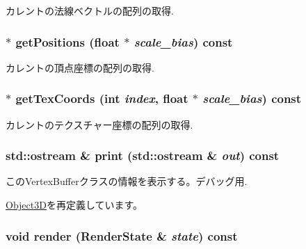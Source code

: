 カレントの法線ベクトルの配列の取得. \hypertarget{classm3g_1_1VertexBuffer_5ca059361f9f834dd00b5d595bf3df0b}{
\subsubsection[{getPositions}]{ $\ast$ getPositions (float $\ast$ {\em scale\_\-bias}) const}}
\label{classm3g_1_1VertexBuffer_5ca059361f9f834dd00b5d595bf3df0b}


カレントの頂点座標の配列の取得. \hypertarget{classm3g_1_1VertexBuffer_9015840c09da0691c31a8aab5e09404a}{
\subsubsection[{getTexCoords}]{ $\ast$ getTexCoords (int {\em index}, \/  float $\ast$ {\em scale\_\-bias}) const}}
\label{classm3g_1_1VertexBuffer_9015840c09da0691c31a8aab5e09404a}


カレントのテクスチャー座標の配列の取得. \hypertarget{classm3g_1_1VertexBuffer_6fea17fa1532df3794f8cb39cb4f911f}{
\subsubsection[{print}]{\setlength{\rightskip}{0pt plus 5cm}std::ostream \& print (std::ostream \& {\em out}) const}}
\label{classm3g_1_1VertexBuffer_6fea17fa1532df3794f8cb39cb4f911f}


このVertexBufferクラスの情報を表示する。デバッグ用. 

\hyperlink{classm3g_1_1Object3D_6fea17fa1532df3794f8cb39cb4f911f}{Object3D}を再定義しています。\hypertarget{classm3g_1_1VertexBuffer_8babc8a79b78615da51161e94029eea9}{
\subsubsection[{render}]{\setlength{\rightskip}{0pt plus 5cm}void render ({\bf RenderState} \& {\em state}) const}}
\label{classm3g_1_1VertexBuffer_8babc8a79b78615da51161e94029eea9}


